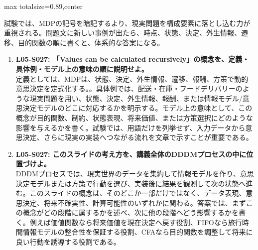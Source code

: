 \begin{minipage}[t]{0.58\textwidth}
\begin{adjustbox}{max totalsize={\textwidth}{0.89\textheight},center}
\begin{minipage}{\textwidth}
試験では、MDPの記号を暗記するより、現実問題を構成要素に落とし込む力が重視される。問題文に新しい事例が出たら、時点、状態、決定、外生情報、遷移、目的関数の順に書くと、体系的な答案になる。\par{}\begin{enumerate}\item \textbf{L05-S027: 「Values can be calculated recursively」の概念を、定義・具体例・モデル上の意味の順に説明せよ。}\\定義としては、MDPは、状態、決定、外生情報、遷移、報酬、方策で動的意思決定を定式化する。。具体例では、配送・在庫・フードデリバリーのような現実問題を用い、状態、決定、外生情報、報酬、または情報モデル/意思決定モデルのどこに対応するかを明示する。モデル上の意味として、この概念が目的関数、制約、状態表現、将来価値、または方策選択にどのような影響を与えるかを書く。試験では、用語だけを列挙せず、入力データから意思決定、さらに現実の実装へつながる流れを文章で示すことが重要である。\item \textbf{L05-S027: このスライドの考え方を、講義全体のDDDMプロセスの中に位置づけよ。}\\DDDMプロセスでは、現実世界のデータを集約して情報モデルを作り、意思決定モデルまたは方策で行動を選び、実装後に結果を観測して次の状態へ進む。このスライドの概念は、そのどこか一部だけではなく、データ表現、意思決定、将来不確実性、計算可能性のいずれかに関わる。答案では、まずこの概念がどの段階に属するかを述べ、次に他の段階へどう影響するかを書く。例えば価値関数なら将来価値を現在決定へ戻す役割、FIFOなら旅行時間情報モデルの整合性を保証する役割、CFAなら目的関数を調整して将来に良い行動を誘導する役割である。\end{enumerate}
\end{minipage}
\end{adjustbox}
\end{minipage}


